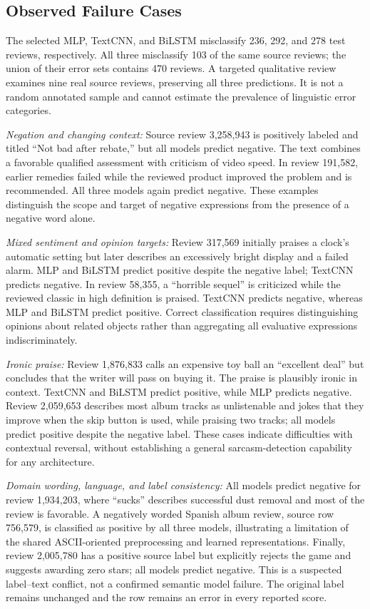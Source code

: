 \subsection{Observed Failure Cases}
The selected MLP, TextCNN, and BiLSTM misclassify 236, 292, and 278 test reviews, respectively. All three misclassify 103 of the same source reviews; the union of their error sets contains 470 reviews. A targeted qualitative review examines nine real source reviews, preserving all three predictions. It is not a random annotated sample and cannot estimate the prevalence of linguistic error categories.

\textit{Negation and changing context:} Source review 3,258,943 is positively labeled and titled ``Not bad after rebate,'' but all models predict negative. The text combines a favorable qualified assessment with criticism of video speed. In review 191,582, earlier remedies failed while the reviewed product improved the problem and is recommended. All three models again predict negative. These examples distinguish the scope and target of negative expressions from the presence of a negative word alone.

\textit{Mixed sentiment and opinion targets:} Review 317,569 initially praises a clock's automatic setting but later describes an excessively bright display and a failed alarm. MLP and BiLSTM predict positive despite the negative label; TextCNN predicts negative. In review 58,355, a ``horrible sequel'' is criticized while the reviewed classic in high definition is praised. TextCNN predicts negative, whereas MLP and BiLSTM predict positive. Correct classification requires distinguishing opinions about related objects rather than aggregating all evaluative expressions indiscriminately.

\textit{Ironic praise:} Review 1,876,833 calls an expensive toy ball an ``excellent deal'' but concludes that the writer will pass on buying it. The praise is plausibly ironic in context. TextCNN and BiLSTM predict positive, while MLP predicts negative. Review 2,059,653 describes most album tracks as unlistenable and jokes that they improve when the skip button is used, while praising two tracks; all models predict positive despite the negative label. These cases indicate difficulties with contextual reversal, without establishing a general sarcasm-detection capability for any architecture.

\textit{Domain wording, language, and label consistency:} All models predict negative for review 1,934,203, where ``sucks'' describes successful dust removal and most of the review is favorable. A negatively worded Spanish album review, source row 756,579, is classified as positive by all three models, illustrating a limitation of the shared ASCII-oriented preprocessing and learned representations. Finally, review 2,005,780 has a positive source label but explicitly rejects the game and suggests awarding zero stars; all models predict negative. This is a suspected label--text conflict, not a confirmed semantic model failure. The original label remains unchanged and the row remains an error in every reported score.

